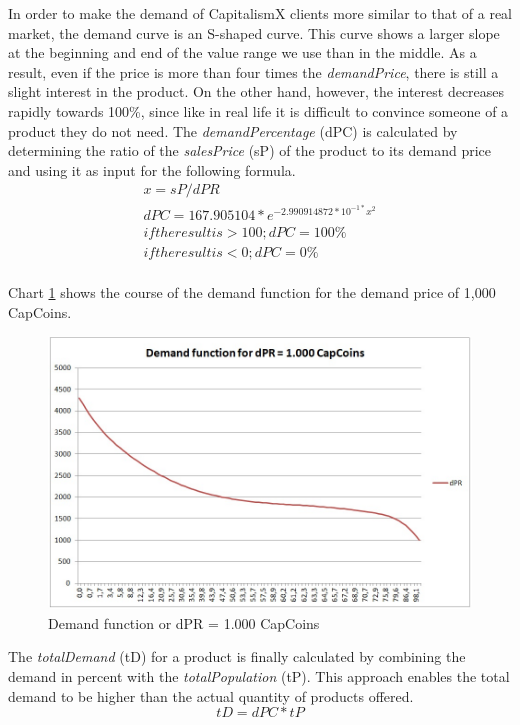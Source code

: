 In order to make the demand of CapitalismX clients more similar to that of a real market, the demand curve is an S-shaped curve. This curve shows a larger slope at the beginning and end of the value range we use than in the middle. As a result, even if the price is more than four times the \textit{demandPrice}, there is still a slight interest in the product. On the other hand, however, the interest decreases rapidly towards 100\%, since like in real life it is difficult to convince someone of a product they do not need. 
The \textit{demandPercentage} (\gls{dPC}) is calculated by determining the ratio of the \textit{salesPrice} (\gls{sP}) of the product to its demand price and using it as input for the following formula.
\begin{equation}
\label{func:demandPercentage}
\begin{aligned}
x = sP / dPR \\
dPC = 167.905104 * e^{−2.990914872 * 10^{ -1* } x^{ 2 } } \\
if the result is > 100; dPC = 100\% \\
if the result is < 0; dPC = 0\% \\    
\end{aligned}
\end{equation}

Chart \ref{jpg:demandFunction} shows the course of the demand function for the demand price of 1,000 CapCoins. 

\begin{figure}
	\centering
	\includegraphics[width=12cm]{images/demandFunction.jpg}
	\caption{Demand function or dPR = 1.000 CapCoins}
	\label{jpg:demandFunction}
\end{figure}
 
The \textit{totalDemand} (\gls{tD}) for a product is finally calculated by combining the demand in percent with the \textit{totalPopulation} (\gls{tP}). This approach enables the total demand to be higher than the actual quantity of products offered.
\begin{equation}
\label{func:totalDemand}
tD= dPC * tP    
\end{equation}

